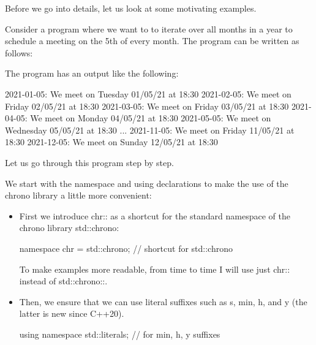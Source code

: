 
Before we go into details, let us look at some motivating examples.


Consider a program where we want to to iterate over all months in a year to schedule a meeting on the 5th of every month. The program can be written as follows:



The program has an output like the following:

\begin{shell}
2021-01-05:
 We meet on Tuesday 01/05/21 at 18:30
2021-02-05:
 We meet on Friday 02/05/21 at 18:30
2021-03-05:
 We meet on Friday 03/05/21 at 18:30
2021-04-05:
 We meet on Monday 04/05/21 at 18:30
2021-05-05:
 We meet on Wednesday 05/05/21 at 18:30
...
2021-11-05:
 We meet on Friday 11/05/21 at 18:30
2021-12-05:
 We meet on Sunday 12/05/21 at 18:30
\end{shell}

Let us go through this program step by step.


We start with the namespace and using declarations to make the use of the chrono library a little more convenient:

\begin{itemize}
\item 
First we introduce chr:: as a shortcut for the standard namespace of the chrono library std::chrono:

\begin{cpp}
namespace chr = std::chrono; // shortcut for std::chrono
\end{cpp}

To make examples more readable, from time to time I will use just chr:: instead of std::chrono::.

\item
Then, we ensure that we can use literal suffixes such as s, min, h, and y (the latter is new since C++20).

\begin{cpp}
using namespace std::literals; // for min, h, y suffixes
\end{cpp}
\end{itemize}

